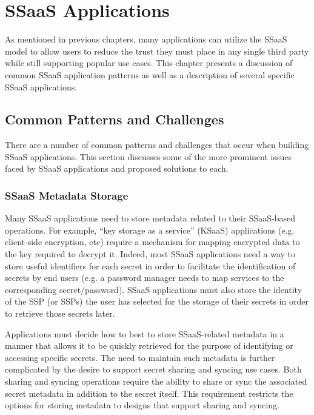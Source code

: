 \chapter{SSaaS Applications}
\label{chap:apps}

As mentioned in previous chapters, many applications can utilize the
SSaaS model to allow users to reduce the trust they must place in any
single third party while still supporting popular use cases. This
chapter presents a discussion of common SSaaS application patterns as
well as a description of several specific SSaaS applications.

\section{Common Patterns and Challenges}

There are a number of common patterns and challenges that occur when
building SSaaS applications. This section discusses some of the more
prominent issues faced by SSaaS applications and proposed solutions to
each.

\subsection{SSaaS Metadata Storage}

Many SSaaS applications need to store metadata related to their
SSaaS-based operations. For example, ``key storage as a service''
(KSaaS) applications (e.g. client-side encryption, etc) require a
mechanism for mapping encrypted data to the key required to decrypt
it. Indeed, most SSaaS applications need a way to store useful
identifiers for each secret in order to facilitate the identification
of secrets by end users (e.g. a password manager needs to map services
to the corresponding secret/password). SSaaS applications must also
store the identity of the SSP (or SSPs) the user has selected for the
storage of their secrets in order to retrieve those secrets later.

Applications must decide how to best to store SSaaS-related metadata
in a manner that allows it to be quickly retrieved for the purpose of
identifying or accessing specific secrets. The need to maintain such
metadata is further complicated by the desire to support secret
sharing and syncing use cases. Both sharing and syncing operations
require the ability to share or sync the associated secret metadata in
addition to the secret itself. This requirement restricts the options
for storing metadata to designs that support sharing and syncing.

